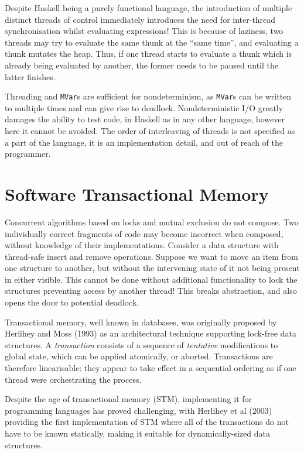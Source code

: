 Despite Haskell being a purely functional language, the introduction
of multiple distinct threads of control immediately introduces the
need for inter-thread synchronisation whilst evaluating
expressions\cite{concurrent}! This is because of laziness, two threads
may try to evaluate the same thunk at the ``same time'', and
evaluating a thunk mutates the heap. Thus, if one thread starts to
evaluate a thunk which is already being evaluated by another, the
former needs to be paused until the latter finishes.

Threading and \verb|MVar|s are sufficient for nondeterminism, as
\verb|MVar|s can be written to multiple times and can give rise to
deadlock. Nondeterministic I/O greatly damages the ability to test
code, in Haskell as in any other language, however here it cannot be
avoided. The order of interleaving of threads is not specified as a
part of the language, it is an implementation detail, and out of reach
of the programmer.

\section{Software Transactional Memory}
\label{sec:litrev-stm}

Concurrent algorithms based on locks and mutual exclusion do not
compose. Two individually correct fragments of code may become
incorrect when composed, without knowledge of their
implementations. Consider a data structure with thread-safe insert and
remove operations. Suppose we want to move an item from one structure
to another, but without the intervening state of it not being present
in either visible. This cannot be done without additional
functionality to lock the structures preventing access by another
thread! This breaks abstraction, and also opens the door to potential
deadlock.

Transactional memory, well known in databases, was originally proposed
by Herlihey and Moss (1993)\nocite{hardwaretm} as an architectural
technique supporting lock-free data structures. A \textit{transaction}
consists of a sequence of \textit{tentative} modifications to global
state, which can be applied atomically, or aborted. Transactions are
therefore linearisable: they appear to take effect in a sequential
ordering as if one thread were orchestrating the process.

Despite the age of transactional memory (STM), implementing it for
programming languages has proved challenging, with Herlihey et al
(2003)\nocite{dstm} providing the first implementation of STM where
all of the transactions do not have to be known statically, making it
suitable for dynamically-sized data structures.

